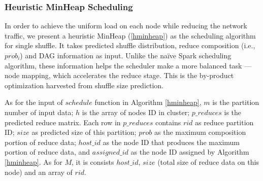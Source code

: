 \subsubsection{Heuristic MinHeap Scheduling}\label{h-minheap}
In order to achieve the uniform load on each node while reducing the network traffic, we present a heuristic MinHeap (\ref{hminheap}) as the scheduling algorithm for single shuffle. It takes predicted shuffle distribution, reduce composition (i.e., $prob_i$) and DAG information as input. Unlike the na\"{i}ve Spark scheduling algorithm, these information helps the scheduler make a more balanced task --- node mapping, which accelerates the reduce stage. This is the by-product optimization harvested from shuffle size prediction.

As for the input of $schedule$ function in Algorithm \ref{hminheap}, $m$ is the partition number of input data; $h$ is the array of nodes ID in cluster; $p\_reduces$ is the predicted reduce matrix. Each row in $p\_reduces$ contains $rid$ as reduce partition ID; $size$ as predicted size of this partition; $prob$ as the maximum composition portion of reduce data; $host\_id$ as the node ID that produces the maximum portion of reduce data, and $assigned\_id$ as the node ID assigned by Algorithm \ref{hminheap}. As for $M$, it is consists $host\_id$, $size$ (total size of reduce data on this node) and an array of $rid$.

